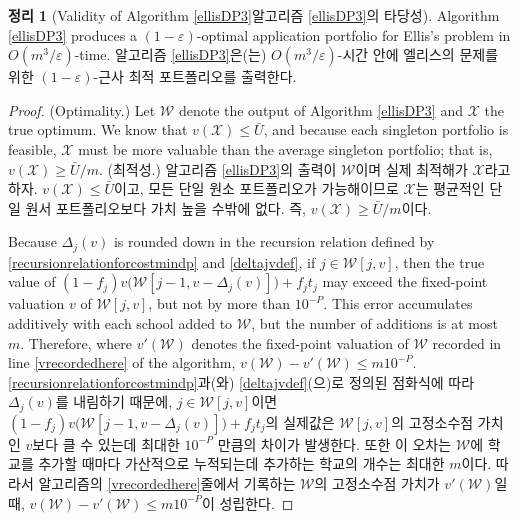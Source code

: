 \documentclass[11pt]{article} %
\newtheorem{theorem}{Theorem}
\theoremstyle{definition}
\newtheorem{theorem}{정리}
\theoremstyle{definition}
\begin{document}
\begin{theorem}[\ifen Validity of Algorithm \ref{ellisDP3}\else 알고리즘 \ref{ellisDP3}의 타당성\fi]
\ifen
Algorithm \ref{ellisDP3} produces a $(1 - \varepsilon)$-optimal application portfolio for Ellis's problem in $O(m^3 /\varepsilon)$-time. %
\else
알고리즘 \ref{ellisDP3}은(는) $O(m^3 /\varepsilon)$-시간 안에 엘리스의 문제를 위한 $(1 - \varepsilon)$-근사 최적 포트폴리오를 출력한다.
\fi
\end{theorem}

\begin{proof}
\ifen
(Optimality.) Let $\mathcal{W}$ denote the output of Algorithm \ref{ellisDP3} and $\mathcal{X}$ the true optimum. We know that $v(\mathcal{X}) \leq \bar U$, and because each singleton portfolio is feasible, $\mathcal{X}$ must be more valuable than the average singleton portfolio; that is, $v(\mathcal{X}) \geq \bar U / m$.
\else
(최적성.) 알고리즘 \ref{ellisDP3}의 출력이 $\mathcal{W}$이며 실제 최적해가 $\mathcal{X}$라고 하자. $v(\mathcal{X}) \leq \bar U$이고, 모든 단일 원소 포트폴리오가 가능해이므로  $\mathcal{X}$는 평균적인 단일 원서 포트폴리오보다 가치 높을 수밖에 없다. 즉,  $v(\mathcal{X}) \geq \bar U / m$이다.
\fi

\ifen
Because $\Delta_j(v)$ is rounded down in the recursion relation defined by \eqref{recursionrelationforcostmindp} and \eqref{deltajvdef}, if $j \in \mathcal{W}[j, v]$, then the true value of $(1 - f_j) v\bigl(\mathcal{W}[j-1, v- \Delta_j(v)]\bigr) + f_j t_j$ may exceed the fixed-point valuation $v$ of $\mathcal{W}[j, v]$, but not by more than $10^{-P}$. This error accumulates additively with each school added to $\mathcal{W}$, but the number of additions is at most $m$. Therefore, where $v'(\mathcal{W})$ denotes the fixed-point valuation of $\mathcal{W}$ recorded in line \ref{vrecordedhere} of the algorithm, 
$v(\mathcal{W}) - v'(\mathcal{W}) \leq m 10^{-P}$.
\else
\eqref{recursionrelationforcostmindp}과(와) \eqref{deltajvdef}(으)로 정의된 점화식에 따라 $\Delta_j(v)$를 내림하기 때문에, $j \in \mathcal{W}[j, v]$이면 $(1 - f_j) v\bigl(\mathcal{W}[j-1, v- \Delta_j(v)]\bigr) + f_j t_j$의 실제값은 $\mathcal{W}[j, v]$의 고정소수점 가치인 $v$보다 클 수 있는데 최대한 $10^{-P}$ 만큼의 차이가 발생한다. 또한 이 오차는 $\mathcal{W}$에 학교를 추가할 때마다 가산적으로 누적되는데 추가하는 학교의 개수는 최대한 $m$이다. 따라서 알고리즘의 \ref{vrecordedhere}줄에서 기록하는 $\mathcal{W}$의 고정소수점 가치가 $v'(\mathcal{W})$일 때, $v(\mathcal{W}) - v'(\mathcal{W}) \leq m 10^{-P}$이 성립한다.
\fi


\end{proof}
\end{document}

